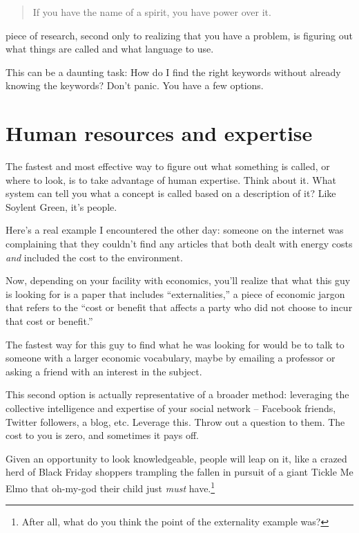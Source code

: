\begin{quote}
  If you have the name of a spirit, you have power over it.
\end{quote}

 piece of research, second only to realizing that you have a
problem, is figuring out what things are called and what language to use.

This can be a daunting task: How do I find the right keywords without already
knowing the keywords? Don't panic. You have a few options.

\section{Human resources and expertise}

The fastest and most effective way to figure out what something is called, or
where to look, is to take advantage of human expertise. Think about it. What 
system can tell you what a concept is called based on a description of it? Like
Soylent Green, it's people.

Here's a real example I encountered the other day: someone on the internet was
complaining that they couldn't find any articles that both dealt with energy
costs \textit{and} included the cost to the environment.

Now, depending on your facility with economics, you'll realize that what this
guy is looking for is a paper that includes ``externalities,'' a
piece of economic jargon that refers to the ``cost or benefit that affects a
party who did not choose to incur that cost or benefit.''

The fastest way for this guy to find what he was looking for would
be to talk to someone with a larger economic vocabulary, maybe by emailing a
professor or asking a friend with an interest in the subject.

This second option is actually representative of a broader method: leveraging the
collective intelligence and expertise of your social network -- Facebook friends,
Twitter followers, a blog, etc. Leverage this. Throw out a question to
them. The cost to you is zero, and sometimes it pays off. 

Given an opportunity to look knowledgeable, people will leap on it, like a
crazed herd of Black Friday shoppers trampling the fallen in pursuit of a giant Tickle Me Elmo that
oh-my-god their child just \textit{must} have.\footnote{After
  all, what do you think the point of the externality example was?}


